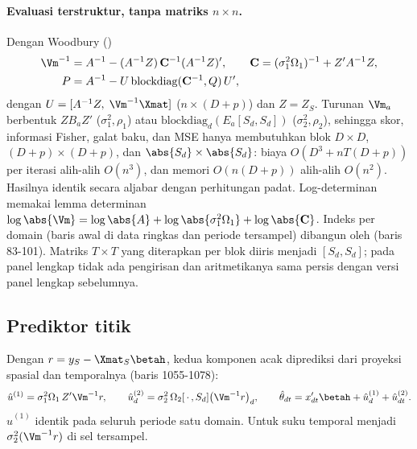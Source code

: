 \paragraph{Evaluasi terstruktur, tanpa matriks $n\times n$.} Dengan Woodbury
()
\begin{equation}
\begin{aligned}
  \Vm^{-1}&=A^{-1}-(A^{-1}Z)\,\mathbf C^{-1}(A^{-1}Z)',
  \qquad
  \mathbf C=(\sigma_1^2\Omega_1)^{-1}+Z'A^{-1}Z,\\
  P&=A^{-1}-U\,\mathrm{blockdiag}(\mathbf C^{-1},Q)\,U',
\end{aligned}
  \label{eq:stfh-woodbury}
\end{equation}
dengan $U=[A^{-1}Z,\;\Vm^{-1}\Xmat]$ ($n\times(D+p)$) dan $Z=Z_S$. Turunan
$\Vm_a$ berbentuk $ZB_aZ'$ ($\sigma_1^2,\rho_1$) atau
$\mathrm{blockdiag}_d(E_a[S_d,S_d])$ ($\sigma_2^2,\rho_2$), sehingga skor,
informasi Fisher, galat baku, dan MSE hanya membutuhkan blok $D\times D$,
$(D+p)\times(D+p)$, dan $\abs{S_d}\times\abs{S_d}$: biaya $O(D^3+nT(D+p))$
per iterasi alih-alih $O(n^3)$, dan memori $O(n(D+p))$ alih-alih $O(n^2)$.
Hasilnya identik secara aljabar dengan perhitungan padat. Log-determinan
memakai lemma determinan
$\log\abs{\Vm}=\log\abs{A}+\log\abs{\sigma_1^2\Omega_1}+\log\abs{\mathbf C}$.
Indeks per domain (baris awal di data ringkas dan periode tersampel) dibangun
oleh  (baris 83-101). Matriks $T\times T$ yang
diterapkan per blok diiris menjadi $[S_d,S_d]$; pada panel lengkap tidak ada
pengirisan dan aritmetikanya sama persis dengan versi panel lengkap
sebelumnya.

\subsection{Prediktor titik}\label{sec:stfh-prediktor}

Dengan $r=y_S-\Xmat_S\betah$, kedua komponen acak diprediksi dari proyeksi
spasial dan temporalnya (baris 1055-1078):
\begin{equation}
  \hat u^{(1)}=\sigma_1^2\Omega_1\,Z'\Vm^{-1}r,
  \qquad
  \hat u^{(2)}_d=\sigma_2^2\,\Omega_2[\,\cdot\,,S_d]\bigl(\Vm^{-1}r\bigr)_d,
  \qquad
  \hat\theta_{dt}=x_{dt}'\betah+\hat u^{(1)}_d+\hat u^{(2)}_{dt}.
  \label{eq:stfh-pred}
\end{equation}
$\hat u^{(1)}$ identik pada seluruh periode satu domain. Untuk
 suku temporal menjadi $\sigma_2^2(\Vm^{-1}r)$ di sel
tersampel.

